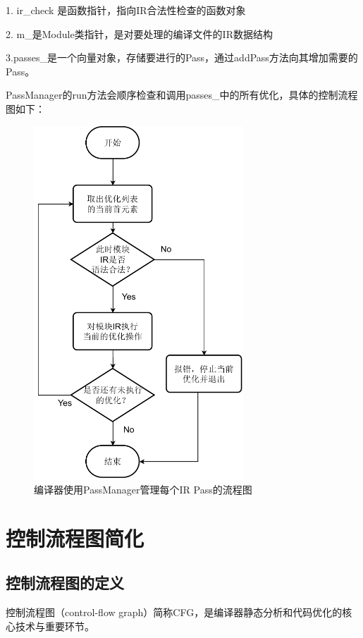 1. ir\_check 是函数指针，指向IR合法性检查的函数对象

2. m\_是Module类指针，是对要处理的编译文件的IR数据结构

3.passes\_是一个向量对象，存储要进行的Pass，通过addPass方法向其增加需要的Pass。

PassManager的run方法会顺序检查和调用passes\_中的所有优化，具体的控制流程图如下：
 
\begin{figure}[htb]
  \centering
  \includegraphics[width=0.7\textwidth]{figures/passManagerRunMethod.pdf}
  \caption{编译器使用PassManager管理每个IR Pass的流程图}
  \label{fig:passMnagerRun}
\end{figure}

\section{控制流程图简化}
\subsection{控制流程图的定义}
控制流程图（control-flow graph）简称CFG，是编译器静态分析和代码优化的核心技术与重要环节。

